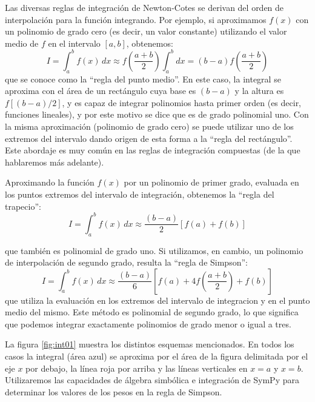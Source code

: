 Las diversas reglas de integración de Newton-Cotes se derivan del orden de interpolación para la función integrando. Por ejemplo, si aproximamos $f(x)$ con un polinomio de grado cero (es decir, un valor constante) utilizando el valor medio de $f$ en el intervalo $[a, b]$, obtenemos:
\begin{equation}\label{eq:int03}
I = \int_a^b f(x) \, dx \approx f \left( \frac{a + b}{2}  \right) \int_a^b dx = (b - a) f \left( \frac{a + b}{2}  \right)
\end{equation} 
que se conoce como la ``regla del punto medio''. En este caso, la integral se aproxima con el área de un rectángulo cuya base es $(b-a)$ y la altura es $f[(b-a)/2]$, y es capaz de integrar polinomios hasta primer orden (es decir, funciones lineales), y por este motivo se dice que es de grado polinomial uno. Con la misma aproximación (polinomio de grado cero) se puede utilizar uno de los extremos del intervalo dando origen de esta forma a la ``regla del rectángulo''. Este abordaje es muy común en las reglas de integración compuestas (de la que hablaremos más adelante).

Aproximando la función $f(x)$ por un polinomio de primer grado, evaluada en los puntos extremos del intervalo de integración, obtenemos la ``regla del trapecio'':
\begin{equation}\label{eq:int04}
I = \int_a^b f(x) \, dx \approx \frac{(b-a)}{2} \left[ f(a) + f(b) \right]
\end{equation} 

que también es polinomial de grado uno. Si utilizamos, en cambio, un polinomio de interpolación de segundo grado, resulta la ``regla de Simpson'':
\begin{equation}\label{eq:int05}
I = \int_a^b f(x) \, dx \approx \frac{(b-a)}{6} \left[ f(a) + 4 f\left( \frac{a+b}{2} \right) + f(b) \right]
\end{equation} 
que utiliza la evaluación en los extremos del intervalo de integracion y en el punto medio del mismo. Este método es polinomial de segundo grado, lo que significa que podemos integrar exactamente polinomios de grado menor o igual a tres.

La figura \ref{fig:int01} muestra los distintos esquemas mencionados. En todos los casos la integral (área azul) se aproxima por el área de la figura delimitada por el eje $x$ por debajo, la línea roja por arriba y las líneas verticales en $x=a$ y $x=b$. Utilizaremos las capacidades de álgebra simbólica e integración de SymPy para determinar los valores de los pesos en la regla de Simpson.


